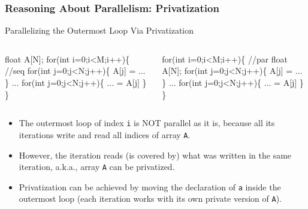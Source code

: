 \documentclass{beamer}
\newcommand{\emp}[1]{\textcolor{DikuRed}{ #1}}
\newcommand{\emphh}[1]{\textcolor{CosGreen}{ #1}}
\begin{document}
\begin{frame}[fragile,t]
  \frametitle{Reasoning About Parallelism: Privatization} %

\vspace{-1ex}
\begin{block}{Parallelizing the Outermost Loop Via Privatization}
\begin{columns}
\begin{colorcode}
float A[N];
\emp{for(int i=0;i<M;i++)\{ //seq}
  for(int j=0;j<N;j++)\{
    A[j] = ...
  \}
  ...
  for(int j=0;j<N;j++)\{
    ... = A[j]
  \}  
\}
\end{colorcode}
\begin{colorcode}
\emphh{for(int i=0;i<M;i++)\{ //par}
  float A[N];
  for(int j=0;j<N;j++)\{
    A[j] = ...
  \}
  ...
  for(int j=0;j<N;j++)\{
    ... = A[j]
  \}  
\}
\end{colorcode}
\end{columns}
\end{block} 

\begin{itemize}
\item The outermost loop of index {\tt i} is NOT parallel as it is,
because all its iterations write and read all indices of
array {\tt A}.\smallskip

\item However, the  iteration reads (is covered by) what was 
written in the same iteration, a.k.a., array {\tt A} can be privatized.

\item Privatization can be achieved by moving the
declaration of {\tt a} inside the outermost loop
(each iteration works with its own private version of {\tt A}).
\end{itemize}

\end{frame}
\end{document}
